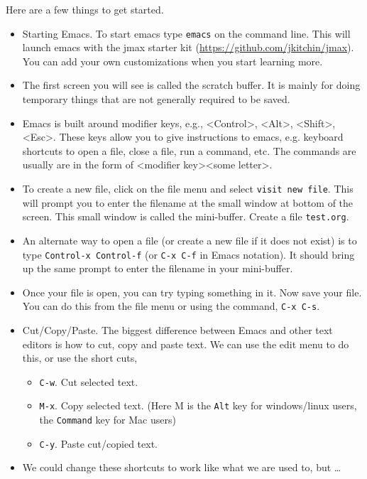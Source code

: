 \documentclass[11pt]{article}
\begin{document}
Here are a few things to get started.

\begin{itemize}
\item Starting Emacs. To start emacs type \verb~emacs~ on the command line. This will launch emacs with the jmax starter kit (\url{https://github.com/jkitchin/jmax}). You can add your own customizations when you start learning more.

\item The first screen you will see is called the scratch buffer. It is mainly for doing temporary things that are not generally required to be saved.

\item Emacs is built around modifier keys, e.g., <Control>, <Alt>, <Shift>, <Esc>. These keys allow you to give instructions to emacs, e.g. keyboard shortcuts to open a file, close a file, run a command, etc. The commands are usually are in the form of <modifier key><some letter>.

\item To create a new file, click on the file menu and select \texttt{visit new file}. This will prompt you to enter the filename at the small window at bottom of the screen. This small window is called the mini-buffer. Create a file \texttt{test.org}.

\item An alternate way to open a file (or create a new file if it does not exist) is to type \verb~Control-x Control-f~ (or \verb~C-x C-f~ in Emacs notation). It should bring up the same prompt to enter the filename in your mini-buffer.

\item Once your file is open, you can try typing something in it. Now save your file. You can do this from the file menu or using the command, \verb~C-x C-s~.

\item Cut/Copy/Paste. The biggest difference between Emacs and other text editors is how to cut, copy and paste text. We can use the edit menu to do this, or use the short cuts,

\begin{itemize}
\item \verb~C-w~. Cut selected text.
\item \verb~M-x~. Copy selected text. (Here M is the \texttt{Alt} key for windows/linux users, the \texttt{Command} key for Mac users)
\item \verb~C-y~. Paste cut/copied text.
\end{itemize}

\item We could change these shortcuts to work like what we are used to, but \ldots{}
\end{itemize}
\end{document}
